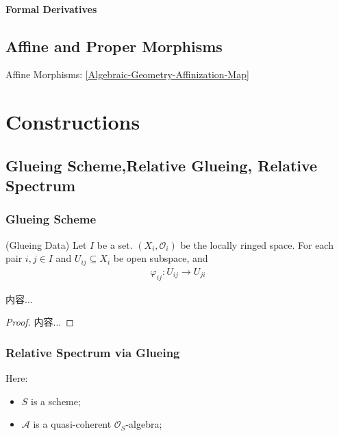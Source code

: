 \documentclass[Total.tex]{subfiles}
\begin{document}
				\subsubsection{Formal Derivatives}
		\section{Affine and Proper Morphisms}
			Affine Morphisms: \ref{Algebraic-Geometry-Affinization-Map}
	\chapter{Constructions}
		\section{Glueing Scheme,Relative Glueing, Relative Spectrum}
			\subsection{Glueing Scheme}
				\begin{Def}
					(Glueing Data) Let $I$ be a set. $(X_i,\mathcal{O}_i)$ be the locally ringed space. For each pair $i,j\in I$ and $U_{ij}\subseteq X_i$ be open subspace, and 
					\begin{gather*}
						\varphi_{ij}:U_{ij}\rightarrow U_{ji}
					\end{gather*}
				\end{Def}
				
				\begin{lemma}
					内容...
				\end{lemma}
				\begin{proof}
					内容...
				\end{proof}
			\subsection{Relative Spectrum via Glueing}
				Here: 
				
				\begin{itemize}
					\item $S$ is a scheme;
					\item $\mathcal{A}$ is a quasi-coherent $\mathcal{O}_S$-algebra;
				\end{itemize}
\end{document}
